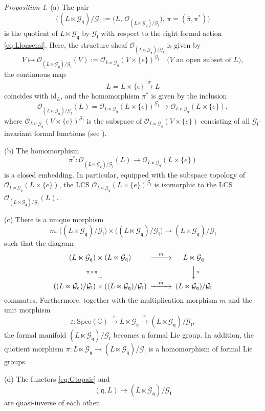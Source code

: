 \documentclass[12pt, a4paper]{amsart}
\newcommand{\BC}{{\mathbb {C}}}
\newcommand{\CG}{{\mathcal {G}}}
\newcommand{\CO}{{\mathcal {O}}}
\newcommand{\Spec}{{\mathrm{Spec}}}
\newcommand{\q}{\mathfrak q}
\renewcommand{\l}{\mathfrak l}
\newcommand{\be}{\begin {equation}}
\newcommand{\ee}{\end {equation}}
\theoremstyle{Theorem}
\theoremstyle{Theorem}
\theoremstyle{Theorem}
\theoremstyle{Theorem}
\theoremstyle{Plain}
\theoremstyle{remark}
\theoremstyle{remark}
\theoremstyle{Definition}
\newtheorem{prpd}[dfn]{Proposition}
\numberwithin{equation}{section}
\begin{document}
\begin{prpd}\label{prop:quo}
\noindent (a) The pair
\[
  \bigg(
    (L\ltimes \CG_{\q})/\CG_{\l}
    :=
    \bigl(
      L,\,
      \CO_{(L\ltimes \CG_{\q})/\CG_{\l}}
    \bigr),\,
    \pi = (\overline{\pi},\pi^*)
  \bigg)
\]
is the quotient of $L\ltimes \CG_\q$ by $\CG_{\l}$ with respect to the right formal action \eqref{eq:Llonsemi}.
Here, the structure sheaf $\CO_{(L\ltimes \CG_{\q})/\CG_{\l}}$ is given by
\[
  V \mapsto
  \CO_{(L\ltimes \CG_{\q})/\CG_{\l}}(V)
  :=
  \CO_{L\ltimes \CG_{\q}}(V\times\{e\})^{\CG_{\l}}
  \quad\text{($V$ an open subset of $L$)},
\]
the continuous map
\[
  L = L\times\{e\} \xrightarrow{\overline{\pi}} L
\]
coincides with $\mathrm{id}_{L}$, and the homomorphism $\pi^*$ is given by the inclusion
\[
  \CO_{(L\ltimes \CG_{\q})/\CG_{\l}}(L)
  =
  \CO_{L\ltimes \CG_{\q}}(L\times \{e\})^{\CG_{\l}}
  \rightarrow
  \CO_{L\ltimes \CG_{\q}}(L\times\{e\}),
\]
where $\CO_{L\ltimes \CG_{\q}}(V\times\{e\})^{\CG_{\l}}$ is the subspace of $\CO_{L\ltimes \CG_{\q}}(V\times\{e\})$ consisting of all $\CG_{\l}$-invariant formal functions (see \cite[Definition 7.2]{CSW4}).

\noindent (b) The homomorphism
\[
  \pi^*:
  \CO_{(L\ltimes \CG_{\q})/\CG_{\l}}(L)
  \rightarrow
  \CO_{L\ltimes \CG_{\q}}(L\times\{e\})
\]
is a closed embedding. In particular, equipped with the subspace topology of $\CO_{L\ltimes \CG_{\q}}(L\times\{e\})$, the LCS $\CO_{L\ltimes \CG_{\q}}(L\times\{e\})^{\CG_{\l}}$ is isomorphic to the LCS $\CO_{(L\ltimes \CG_{\q})/\CG_{\l}}(L)$.

\noindent (c) There is a unique morphism
\[
  m:
  \bigl((L\ltimes \CG_{\q})/\CG_{\l}\bigr)
  \times
  \bigl((L\ltimes \CG_{\q})/\CG_{\l}\bigr)
  \rightarrow
  (L\ltimes \CG_{\q})/\CG_{\l}
\]
such that the diagram
\be \label{eq:diaofm0}
\begin{CD}
    (L\ltimes \CG_{\q})\times (L\ltimes \CG_{\q}) @>m>> L\ltimes \CG_{\q} \\
    @V\pi \times \pi VV @VV\pi V\\
    ((L\ltimes \CG_{\q})/\CG_{\l})\times ((L\ltimes \CG_{\q})/\CG_{\l}) @>m>> (L\ltimes \CG_{\q})/\CG_{\l}
\end{CD}
\ee
commutes. Furthermore, together with the multiplication morphism $m$ and the unit morphism
\[
  \varepsilon:
  \Spec(\BC) \xrightarrow{\varepsilon} L\ltimes \CG_{\q} \xrightarrow{\pi} (L\ltimes \CG_{\q})/\CG_{\l},
\]
the formal manifold $(L\ltimes \CG_{\q})/\CG_{\l}$ becomes a formal Lie group. In addition, the quotient morphism $\pi: L\ltimes \CG_{\q}\to (L\ltimes \CG_{\q})/\CG_{\l}$ is a homomorphism of formal Lie groups.

\noindent (d) The functors \eqref{eq:Gtopair} and
\be \label{eq:funcpairtogroup}
  (\q,L) \mapsto (L\ltimes \mathcal{G}_{\q})/\mathcal{G}_{\l}
\ee
are quasi-inverse of each other.
\end{prpd}
\end{document}
